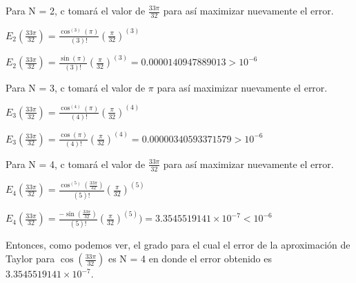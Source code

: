 \documentclass[english,notitlepage,letterpaper, 10pt]{article} %
\begin{document}
\begin{enumerate}
    Para N = 2, c tomará el valor de $\frac{33 \pi}{32}$ para así maximizar nuevamente el error. 

    \begin{center}
      \begin{math}
        E_2(\frac{33 \pi}{32}) = \displaystyle \frac{\cos^{(3)}(\pi)}{(3)!} \textstyle (\frac{ \pi}{32})^{(3)}
      \end{math}

      \begin{math}
        E_2(\frac{33 \pi}{32}) = \displaystyle \frac{\sin(\pi)}{(3)!} \textstyle (\frac{ \pi}{32})^{(3)} = 0.0000140947889013 > 10^{-6}
      \end{math}
    \end{center}

    Para N = 3, c tomará el valor de $\pi$ para así maximizar nuevamente el error. 

    \begin{center}
      \begin{math}
        E_3(\frac{33 \pi}{32}) = \displaystyle \frac{\cos^{(4)}(\pi)}{(4)!} \textstyle (\frac{ \pi}{32})^{(4)}
      \end{math}
    \end{center}

    \begin{center}
      \begin{math}
        E_3(\frac{33 \pi}{32}) = \displaystyle \frac{\cos(\pi)}{(4)!} \textstyle (\frac{ \pi}{32})^{(4)} = 0.00000340593371579 > 10^{-6}
      \end{math}
    \end{center}

    Para N = 4, c tomará el valor de $\frac{33 \pi}{32}$ para así maximizar nuevamente el error. 

    \begin{center}
      \begin{math}
        E_4(\frac{33 \pi}{32}) = \displaystyle \frac{\cos^{(5)}(\frac{33 \pi}{32})}{(5)!} \textstyle (\frac{ \pi}{32})^{(5)}
      \end{math}
    \end{center}

    \begin{center}
      \begin{math}
        E_4(\frac{33 \pi}{32}) = \displaystyle \frac{-\sin(\frac{33 \pi}{32})}{(5)!} \textstyle (\frac{\pi}{32})^{(5)}) = 3.3545519141 \times 10^{-7} < 10^{-6}
      \end{math}
    \end{center}

    Entonces, como podemos ver, el grado para el cual el error de la aproximación de Taylor para $\cos(\frac{33 \pi}{32})$ es N = 4 en donde el error obtenido es $3.3545519141 \times 10^{-7} $.

\end{enumerate}
\end{document}
